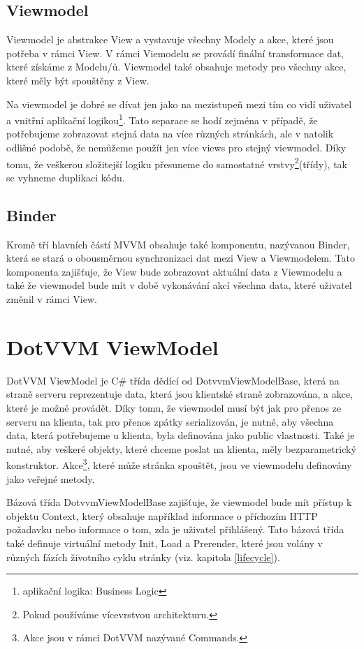 \subsection*{Viewmodel}
Viewmodel je abstrakce View a vystavuje všechny Modely a akce, které jsou potřeba v rámci View. V rámci Viemodelu se provádí finální transformace dat, které získáme z Modelu/ů. Viewmodel také obsahuje metody pro všechny akce, které měly být spouštěny z View.

Na viewmodel je dobré se dívat jen jako na mezistupeň mezi tím co vidí uživatel a vnitřní aplikační logikou\footnote{aplikační logika: Business Logic}. Tato separace se hodí zejména v případě, že potřebujeme zobrazovat stejná data na více různých stránkách, ale v natolik odlišné podobě, že nemůžeme použít jen více views pro stejný viewmodel. Díky tomu, že veškerou složitejší logiku přesuneme do samostatné vrstvy\footnote{Pokud používáme vícevrstvou architekturu.}(třídy), tak se vyhneme duplikaci kódu.
\subsection*{Binder}
Kromě tří hlavních částí MVVM obsahuje také komponentu, nazývanou Binder, která se stará o obousměrnou synchronizaci dat mezi View a Viewmodelem. Tato komponenta zajišťuje, že View bude zobrazovat aktuální data z Viewmodelu a také že viewmodel bude mít v době vykonávání akcí všechna data, které uživatel změnil v rámci View.

\section{DotVVM ViewModel}

DotVVM ViewModel je C\# třída dědící od DotvvmViewModelBase, která na straně serveru reprezentuje data, která jsou klientské straně zobrazována, a akce, které je možné provádět.
Díky tomu, že viewmodel musí být jak pro přenos ze serveru na klienta, tak pro přenos zpátky serializován, je nutné, aby všechna data, která potřebujeme u klienta, byla definována jako public vlastnosti. Také je nutné, aby veškeré objekty, které chceme poslat na klienta, měly bezparametrický konstruktor.
Akce\footnote{Akce jsou v rámci DotVVM nazývané Commands.\cite{DotVVM-VM}}, které může stránka spouštět, jsou ve viewmodelu definovány jako veřejné metody.

Bázová třída DotvvmViewModelBase zajišťuje, že viewmodel bude mít přístup k objektu Context, který obsahuje například informace o příchozím HTTP požadavku nebo informace o tom, zda je uživatel přihlášený.
Tato bázová třída také definuje virtuální metody Init, Load a Prerender, které jsou volány v různých fázích životního cyklu stránky (viz. kapitola \ref{lifecycle}).

